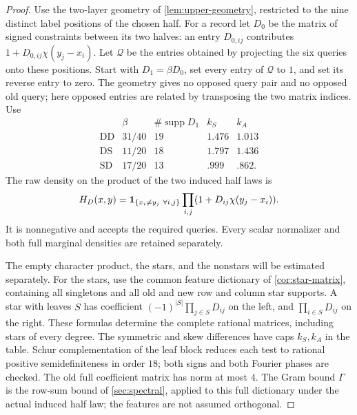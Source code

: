 \begin{proof}
Use the two-layer geometry of \cref{lem:upper-geometry}, restricted
to the nine distinct label positions of the chosen half.
For a record let $D_0$ be the matrix of signed constraints between
its two halves: an entry $D_{0,ij}$ contributes
$1+D_{0,ij}\chi(y_j-x_i)$. Let $\mathcal Q$ be the entries obtained
by projecting the six queries onto these positions.
Start with $D_1=\beta D_0$, set every entry of $\mathcal Q$ to $1$,
and set its reverse entry to zero. The geometry gives no opposed
query pair and no opposed old query; here opposed entries are
related by transposing the two matrix indices. Use
\[
\begin{array}{c|c|c|c|c}
 &\beta&\#\operatorname{supp}D_1&k_S&k_A\\ \hline
\mathrm{DD}&31/40&19&1.476&1.013\\
\mathrm{DS}&11/20&18&1.797&1.436\\
\mathrm{SD}&17/20&13&.999&.862.
\end{array}
\]
The raw density on the product of the two induced half laws is
\[
 H_D(x,y)=\mathbf 1_{\{x_i\ne y_j\ \forall i,j\}}
                 \prod_{i,j}(1+D_{ij}\chi(y_j-x_i)).
\]
It is nonnegative and accepts the required queries. Every scalar
normalizer and both full marginal densities are retained separately.

The empty character product, the stars, and the nonstars will be
estimated separately. For the stars, use the common feature dictionary
of \cref{cor:star-matrix}, containing all singletons and all old and
new row and column star supports. A star with leaves $S$ has coefficient
$(-1)^{|S|}\prod_{j\in S}D_{ij}$ on the left, and
$\prod_{i\in S}D_{ij}$ on the right. These formulas determine the
complete rational matrices, including stars of every degree.
The symmetric and skew differences have caps $k_S,k_A$ in the table.
Schur complementation of the leaf block reduces each test to rational
positive semidefiniteness in order $18$; both signs and both Fourier
phases are checked. The old full coefficient matrix has norm at most $4$.
The Gram bound $\Gamma$ is the row-sum bound of
\cref{sec:spectral}, applied to this full dictionary under the
actual induced half law; the features are not assumed orthogonal.


\end{proof}
